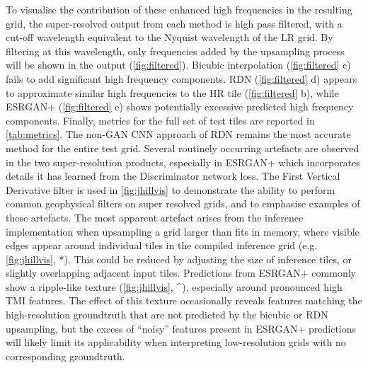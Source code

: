 \documentclass[manuscript.tex]{subfiles}
\begin{document}
To visualise the contribution of these enhanced high frequencies in the resulting grid, the super-resolved output from each method is high pass filtered, with a cut-off wavelength equivalent to the Nyquist wavelength of the LR grid.
By filtering at this wavelength, only frequencies added by the upsampling process will be shown in the output (\cref{fig:filtered}). Bicubic interpolation (\cref{fig:filtered} c) fails to add significant high frequency components.
RDN\textdaggerdbl{} (\cref{fig:filtered} d) appears to approximate similar high frequencies to the HR tile (\cref{fig:filtered} b), while ESRGAN+ (\cref{fig:filtered} e) shows potentially excessive predicted high frequency components.
Finally, metrics for the full set of test tiles are reported in \cref{tab:metrics}.
The non-GAN CNN approach of RDN\textdaggerdbl{} remains the most accurate method for the entire test grid.
Several routinely occurring artefacts are observed in the two super-resolution products, especially in ESRGAN+ which incorporates details it has learned from the Discriminator network loss.
The First Vertical Derivative filter is used in \cref{fig:jhillvis} to demonstrate the ability to perform common geophysical filters on super resolved grids, and to emphasise examples of these artefacts.
The most apparent artefact arises from the inference implementation when upsampling a grid larger than fits in memory, where visible edges appear around individual tiles in the compiled inference grid (e.g. \cref{fig:jhillvis}, *).
This could be reduced by adjusting the size of inference tiles, or slightly overlapping adjacent input tiles.
Predictions from ESRGAN+ commonly show a ripple-like texture (\cref{fig:jhillvis}, \^{ }), especially around pronounced high TMI features.
The effect of this texture occasionally reveals features matching the high-resolution groundtruth that are not predicted by the bicubic or RDN\textdaggerdbl{} upsampling, but the excess of “noisy” features present in ESRGAN+ predictions will likely limit its applicability when interpreting low-resolution grids with no corresponding groundtruth.
\end{document}
